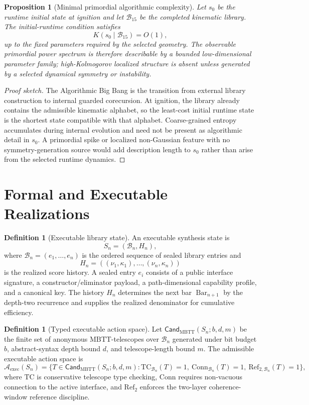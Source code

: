 \documentclass[11pt]{article}
\theoremstyle{plain}
\newtheorem{proposition}[theorem]{Proposition}
\theoremstyle{definition}
\newtheorem{definition}[theorem]{Definition}
\theoremstyle{remark}
\newenvironment{proofsketch}{\begin{proof}[Proof sketch]}{\end{proof}}
\newcommand{\MBTT}{\mathrm{MBTT}}
\newcommand{\B}{\mathcal{B}}
\newcommand{\A}{\mathcal{A}}
\newcommand{\Cand}{\mathsf{Cand}}
\newcommand{\SelBar}{\operatorname{Bar}}
\begin{document}
\begin{proposition}[Minimal primordial algorithmic complexity]
Let \(s_0\) be the runtime initial state at ignition and let \(\B_{15}\) be the completed kinematic library. The initial-runtime condition satisfies
\[
K(s_0\mid \B_{15})=O(1),
\]
up to the fixed parameters required by the selected geometry. The observable primordial power spectrum is therefore describable by a bounded low-dimensional parameter family; high-Kolmogorov localized structure is absent unless generated by a selected dynamical symmetry or instability.
\end{proposition}

\begin{proofsketch}
The Algorithmic Big Bang is the transition from external library construction to internal guarded corecursion. At ignition, the library already contains the admissible kinematic alphabet, so the least-cost initial runtime state is the shortest state compatible with that alphabet. Coarse-grained entropy accumulates during internal evolution and need not be present as algorithmic detail in \(s_0\). A primordial spike or localized non-Gaussian feature with no symmetry-generation source would add description length to \(s_0\) rather than arise from the selected runtime dynamics.
\end{proofsketch}

\section{Formal and Executable Realizations}

\begin{definition}[Executable library state]
An executable synthesis state is
\[
S_n=(\B_n,H_n),
\]
where \(\B_n=(e_1,\ldots,e_n)\) is the ordered sequence of sealed library entries and
\[
H_n=((\nu_1,\kappa_1),\ldots,(\nu_n,\kappa_n))
\]
is the realized score history. A sealed entry \(e_i\) consists of a public interface signature, a constructor/eliminator payload, a path-dimensional capability profile, and a canonical key. The history \(H_n\) determines the next bar \(\SelBar_{n+1}\) by the depth-two recurrence and supplies the realized denominator for cumulative efficiency.
\end{definition}

\begin{definition}[Typed executable action space]
Let \(\Cand_{\MBTT}(S_n;b,d,m)\) be the finite set of anonymous \(\MBTT\)-telescopes over \(\B_n\) generated under bit budget \(b\), abstract-syntax depth bound \(d\), and telescope-length bound \(m\). The admissible executable action space is
\[
\A_{\mathrm{exec}}(S_n)=
\{T\in \Cand_{\MBTT}(S_n;b,d,m):
\mathrm{TC}_{\B_n}(T)=1,\ \mathrm{Conn}_{\B_n}(T)=1,\ \mathrm{Ref}_{2,\B_n}(T)=1\},
\]
where \(\mathrm{TC}\) is conservative telescope type checking, \(\mathrm{Conn}\) requires non-vacuous connection to the active interface, and \(\mathrm{Ref}_2\) enforces the two-layer coherence-window reference discipline.
\end{definition}
\end{document}
